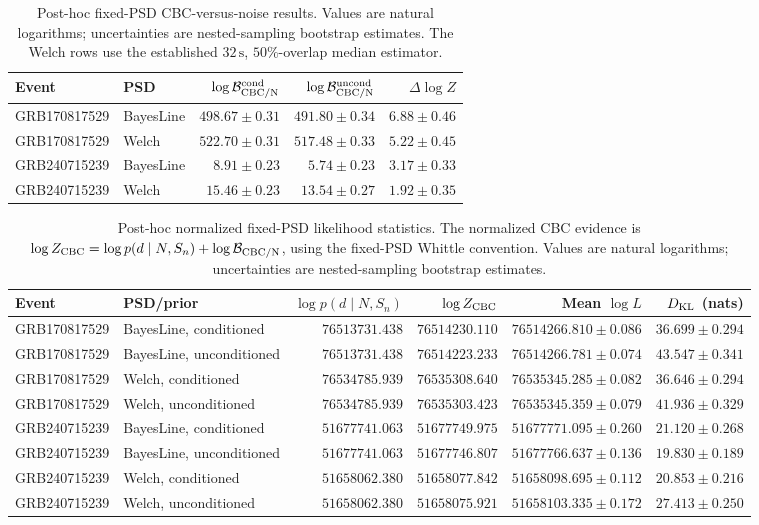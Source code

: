\begin{table}[ht]
\centering
\caption{Post-hoc fixed-PSD CBC-versus-noise results. Values are natural
logarithms; uncertainties are nested-sampling bootstrap estimates. The Welch
rows use the established $32\,\mathrm{s}$, $50\%$-overlap median estimator.}
\begin{tabular}{llrrr}
\toprule
\textbf{Event} & \textbf{PSD} & \textbf{$\log\mathcal{B}_{\rm CBC/N}^{\rm cond}$}
& \textbf{$\log\mathcal{B}_{\rm CBC/N}^{\rm uncond}$}
& \textbf{$\Delta\log Z$}\\
\midrule
GRB170817529 & BayesLine & $498.67 \pm 0.31$ & $491.80 \pm 0.34$ & $6.88 \pm 0.46$\\
GRB170817529 & Welch & $522.70 \pm 0.31$ & $517.48 \pm 0.33$ & $5.22 \pm 0.45$\\
GRB240715239 & BayesLine & $8.91 \pm 0.23$ & $5.74 \pm 0.23$ & $3.17 \pm 0.33$\\
GRB240715239 & Welch & $15.46 \pm 0.23$ & $13.54 \pm 0.27$ & $1.92 \pm 0.35$\\
\bottomrule
\end{tabular}
\end{table}

\begin{table}[ht]
\centering
\small
\caption{Post-hoc normalized fixed-PSD likelihood statistics. The normalized
CBC evidence is $\log Z_{\rm CBC}=\log p(d\mid N,S_n)+
\log\mathcal{B}_{\rm CBC/N}$, using the fixed-PSD Whittle convention. Values
are natural logarithms; uncertainties are nested-sampling bootstrap estimates.}
\begin{tabular}{llrrrr}
\toprule
\textbf{Event} & \textbf{PSD/prior} & \textbf{$\log p(d\mid N,S_n)$}
& \textbf{$\log Z_{\rm CBC}$} & \textbf{Mean $\log L$}
& \textbf{$D_{\rm KL}$ (nats)}\\
\midrule
GRB170817529 & BayesLine, conditioned & $76513731.438$ & $76514230.110$
& $76514266.810 \pm 0.086$ & $36.699 \pm 0.294$\\
GRB170817529 & BayesLine, unconditioned & $76513731.438$ & $76514223.233$
& $76514266.781 \pm 0.074$ & $43.547 \pm 0.341$\\
GRB170817529 & Welch, conditioned & $76534785.939$ & $76535308.640$
& $76535345.285 \pm 0.082$ & $36.646 \pm 0.294$\\
GRB170817529 & Welch, unconditioned & $76534785.939$ & $76535303.423$
& $76535345.359 \pm 0.079$ & $41.936 \pm 0.329$\\
\addlinespace
GRB240715239 & BayesLine, conditioned & $51677741.063$ & $51677749.975$
& $51677771.095 \pm 0.260$ & $21.120 \pm 0.268$\\
GRB240715239 & BayesLine, unconditioned & $51677741.063$ & $51677746.807$
& $51677766.637 \pm 0.136$ & $19.830 \pm 0.189$\\
GRB240715239 & Welch, conditioned & $51658062.380$ & $51658077.842$
& $51658098.695 \pm 0.112$ & $20.853 \pm 0.216$\\
GRB240715239 & Welch, unconditioned & $51658062.380$ & $51658075.921$
& $51658103.335 \pm 0.172$ & $27.413 \pm 0.250$\\
\bottomrule
\end{tabular}
\end{table}

